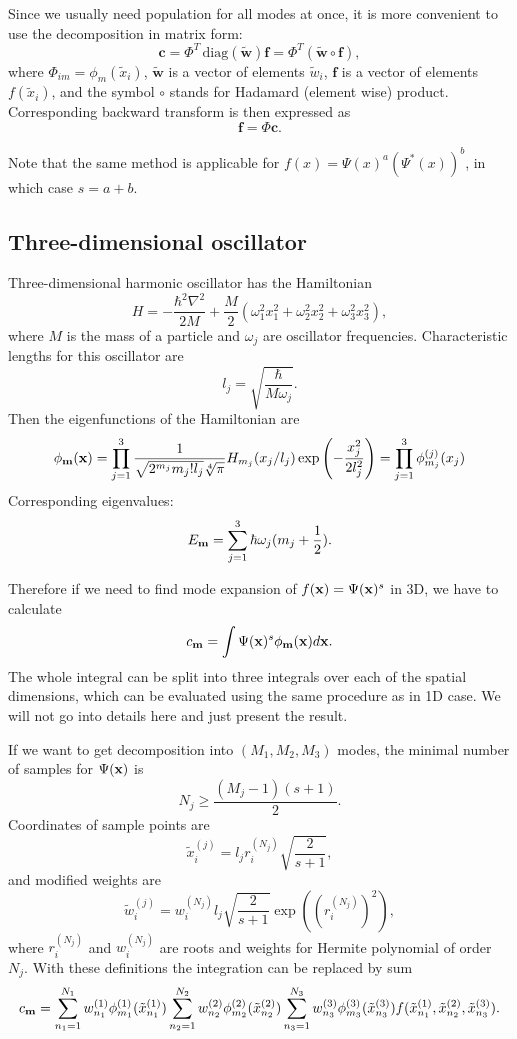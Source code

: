 Since we usually need population for all modes at once,
it is more convenient to use the decomposition in matrix form:
\[
    \mathbf{c}
    = \Phi^T\,\mathrm{diag}(\tilde{\mathbf{w}}) \mathbf{f}
    = \Phi^T (\tilde{\mathbf{w}} \circ \mathbf{f}),
\]
where $\Phi_{im} = \phi_m(\tilde{x}_i)$,
$\tilde{\mathbf{w}}$ is a vector of elements $\tilde{w}_i$,
$\mathbf{f}$ is a vector of elements $f(\tilde{x}_i)$,
and the symbol $\circ$ stands for Hadamard (element wise) product.
Corresponding backward transform is then expressed as
\[
    \mathbf{f} = \Phi \mathbf{c}.
\]

Note that the same method is applicable for $f(x) = \Psi(x)^a (\Psi^*(x))^b$,
in which case $s = a + b$.


\subsection{Three-dimensional oscillator}

Three-dimensional harmonic oscillator has the Hamiltonian
\[
    H = -\frac{\hbar^2 \nabla^2}{2 M}
        + \frac{M}{2} (
            \omega_1^2 x_1^2 + \omega_2^2 x_2^2 + \omega_3^2 x_3^2
        ),
\]
where $M$ is the mass of a particle and $\omega_j$ are oscillator frequencies.
Characteristic lengths for this oscillator are
\[
    l_j = \sqrt{\frac{\hbar}{M \omega_j}}.
\]
Then the eigenfunctions of the Hamiltonian are
\[
    \phi_{\mathbf{m}} (\mathbf{x})
    = \prod_{j=1}^3
        \frac{1}{\sqrt{2^{m_j} m_j! l_j} \sqrt[4]{\pi}} H_{m_j}(x_j / l_j)
        \exp \left( -\frac{x_j^2}{2 l_j^2} \right)
    = \prod_{j=1}^3 \phi_{m_j}^{(j)} (x_j)
\]
Corresponding eigenvalues:
\[
    E_{\mathbf{m}} = \sum_{j=1}^3 \hbar \omega_j (m_j + \frac{1}{2}).
\]

Therefore if we need to find mode expansion of $f(\mathbf{x}) = \Psi(\mathbf{x})^s$ in 3D, we have to calculate
\[
    c_{\mathbf{m}} = \int \Psi(\mathbf{x})^s \phi_{\mathbf{m}}(\mathbf{x}) d\mathbf{x}.
\]
The whole integral can be split into three integrals over each of the spatial dimensions,
which can be evaluated using the same procedure as in 1D case.
We will not go into details here and just present the result.

If we want to get decomposition into $(M_1, M_2, M_3)$ modes,
the minimal number of samples for $\Psi(\mathbf{x})$ is
\[
    N_j \ge \frac{(M_j - 1)(s + 1)}{2}.
\]
Coordinates of sample points are
\[
    \tilde{x}_{i}^{(j)} = l_j r_i^{(N_j)} \sqrt{\frac{2}{s+1}},
\]
and modified weights are
\[
    \tilde{w}_{i}^{(j)} = w_i^{(N_j)} l_j \sqrt{\frac{2}{s+1}} \exp((r_i^{(N_j)})^2),
\]
where $r_i^{(N_j)}$ and $w_i^{(N_j)}$ are roots and weights for Hermite polynomial of order $N_j$.
With these definitions the integration can be replaced by sum
\[
    c_{\mathbf{m}}
    = \sum_{n_1=1}^{N_1} w_{n_1}^{(1)} \phi_{m_1}^{(1)} (\tilde{x}_{n_1}^{(1)})
        \sum_{n_2=1}^{N_2} w_{n_2}^{(2)} \phi_{m_2}^{(2)} (\tilde{x}_{n_2}^{(2)})
        \sum_{n_3=1}^{N_3} w_{n_3}^{(3)} \phi_{m_3}^{(3)} (\tilde{x}_{n_3}^{(3)})
        f(\tilde{x}_{n_1}^{(1)}, \tilde{x}_{n_2}^{(2)}, \tilde{x}_{n_3}^{(3)}).
\]

